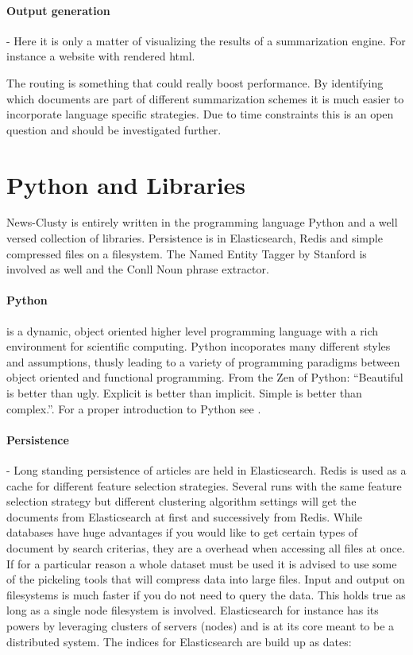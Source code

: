   \paragraph{Output generation} - Here it is only a matter of visualizing the results of a summarization engine. For instance a website with rendered html.

  The routing is something that could really boost performance. By identifying which documents are part of different summarization schemes it is much easier to incorporate language specific strategies. Due to time constraints this is an open question and should be investigated further.

\section{Python and Libraries}
  News-Clusty is entirely written in the programming language Python and a well versed collection of libraries. Persistence is in Elasticsearch, Redis and simple compressed files on a filesystem. The Named Entity Tagger by Stanford is involved as well and the Conll Noun phrase extractor. 

  \paragraph{Python} is a dynamic, object oriented higher level programming language with a rich environment for scientific computing. Python incoporates many different styles and assumptions, thusly leading to a variety of programming paradigms between object oriented and functional programming. From the Zen of Python: ``Beautiful is better than ugly. Explicit is better than implicit. Simple is better than complex.''. For a proper introduction to Python see \cite{NltkPython}.

  \paragraph{Persistence} - Long standing persistence of articles are held in Elasticsearch. Redis is used as a cache for different feature selection strategies. Several runs with the same feature selection strategy but different clustering algorithm settings will get the documents from Elasticsearch at first and successively from Redis. While databases have huge advantages if you would like to get certain types of document by search criterias, they are a overhead when accessing all files at once. If for a particular reason a whole dataset must be used it is advised to use some of the pickeling tools that will compress data into large files. Input and output on filesystems is much faster if you do not need to query the data. This holds true as long as a single node filesystem is involved. Elasticsearch for instance has its powers by leveraging clusters of servers (nodes) and is at its core meant to be a distributed system. The indices for Elasticsearch are build up as dates:

